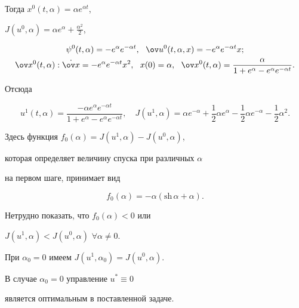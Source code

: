 Тогда $x^0(t,\alpha)=\alpha e^{\alpha t}$,


$J(u^0,\alpha)=\alpha e^{\alpha}+\frac{\alpha^2}{2}$,


\begin{gather*}


\psi^0(t,\alpha)=-e^{\alpha}e^{-\alpha t},


\ \ \ov u^0(t,\alpha, x)=-e^{\alpha}e^{-\alpha t}x;\\


%


\ov x^0(t,\alpha): \Dot{\ov x}=-e^{\alpha}e^{-\alpha t}x^2,\ \ x(0)=\alpha,


\ \ \ov x^0(t,\alpha)=\frac{\alpha}{1+e^{\alpha}-e^{\alpha}e^{-\alpha t}}.


\end{gather*}


Отсюда 


$$


u^1(t,\alpha)=\frac{-\alpha e^{\alpha}e^{-\alpha t}}{1+e^{\alpha}-


e^{\alpha}e^{-\alpha t}},\quad


J(u^1,\alpha)=\alpha e^{-\alpha}+\frac 1 2 \alpha e^{\alpha}-


\frac 1 2 \alpha e^{-\alpha}-\frac 1 2 \alpha^2.


$$


Здесь функция $f_0(\alpha)=J(u^1,\alpha)-J(u^0,\alpha)$,


которая определяет величину спуска при различных $\alpha$ 


на первом шаге, принимает вид


$$


f_0(\alpha)=-\alpha(\text{sh}\, \alpha +\alpha).


$$


Нетрудно показать, что $f_0(\alpha)<0$ или


$J(u^1,\alpha)<J(u^0,\alpha)$\; $\forall \alpha \neq 0$.


При $\alpha_0=0$ имеем $J(u^1,\alpha_0)=J(u^0,\alpha)$.


В случае $\alpha_0=0$ управление $u^{\ast}\equiv 0$


является оптимальным в поставленной задаче.








